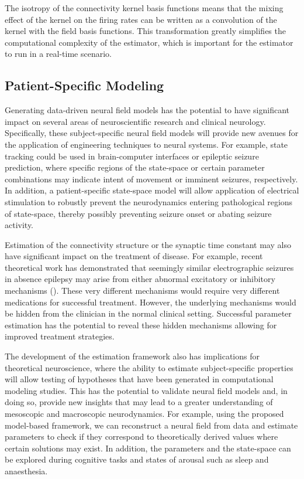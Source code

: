\documentclass[5p,authoryear]{elsarticle}
\begin{document}
The isotropy of the connectivity kernel basis functions means that the mixing effect of the kernel on the firing rates can be written as a convolution of the kernel with the field basis functions. This transformation greatly simplifies the computational complexity of the estimator, which is important for the estimator to run in a real-time scenario.

\subsection{Patient-Specific Modeling}

Generating data-driven neural field models has the potential to have significant impact on several areas of neuroscientific research and clinical neurology. Specifically, these subject-specific neural field models will provide new avenues for the application of engineering techniques to neural systems. For example, state tracking could be used in brain-computer interfaces or epileptic seizure prediction, where specific regions of the state-space or certain parameter combinations may indicate intent of movement or imminent seizures, respectively. In addition, a patient-specific state-space model will allow application of electrical stimulation to robustly prevent the neurodynamics entering pathological regions of state-space, thereby possibly preventing seizure onset or abating seizure activity.

Estimation of the connectivity structure or the synaptic time constant may also have significant impact on the treatment of disease. For example, recent theoretical work has demonstrated that seemingly similar electrographic seizures in absence epilepsy may arise from either abnormal excitatory or inhibitory mechanisms (\cite{Marten2009}). These very different mechanisms would require very different medications for successful treatment. However, the underlying mechanisms would be hidden from the clinician in the normal clinical setting. Successful parameter estimation has the potential to reveal these hidden mechanisms allowing for improved treatment strategies. 

The development of the estimation framework also has implications for theoretical neuroscience, where the ability to estimate subject-specific properties will allow testing of hypotheses that have been generated in computational modeling studies. This has the potential to validate neural field models and, in doing so, provide new insights that may lead to a greater understanding of mesoscopic and macroscopic neurodynamics. For example, using the proposed model-based framework, we can reconstruct a neural field from data and estimate parameters to check if they correspond to theoretically derived values where certain solutions may exist. In addition, the parameters and the state-space can be explored during cognitive tasks and states of arousal such as sleep and anaesthesia. 
\end{document}
